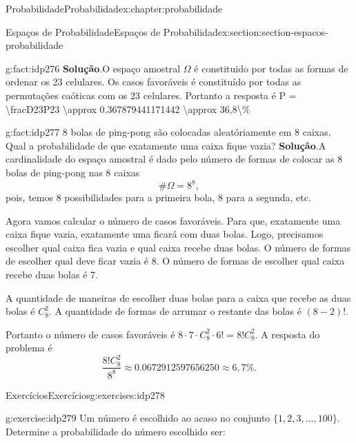 \documentclass[oneside,10pt,]{book}
\newcommand{\blocktitlefont}{\relax}
\numberwithin{equation}{section}
\begin{document}
\begin{chapterptx}{Probabilidade}{}{Probabilidade}{}{}{x:chapter:probabilidade}
\begin{sectionptx}{Espaços de Probabilidade}{}{Espaços de Probabilidade}{}{}{x:section:section-espacos-probabilidade}
\begin{fact}{}{}{g:fact:idp276}
\textbf{\blocktitlefont Solução}.\quad{}O espaço amostral \(\Omega\) é constituido por todas as formas de ordenar os 23 celulares. Os casos favoráveis é constituído por todas as permutações caóticas com os 23 celulares. Portanto a resposta é \textdollar{}\textdollar{}P = \textbackslash{}frac\textbraceleft{}D\textunderscore{}\textbraceleft{}23\textbraceright{}\textbraceright{}\textbraceleft{}P\textunderscore{}\textbraceleft{}23\textbraceright{}\textbraceright{} \textbackslash{}approx 0.367879441171442 \textbackslash{}approx 36,8\textbackslash{}\%\textdollar{}\textdollar{}%
\end{fact}
\begin{fact}{}{}{g:fact:idp277}%
8 bolas de ping-pong são colocadas aleatóriamente em 8 caixas. Qual a probabilidade de que exatamente uma caixa fique vazia?%
\textbf{\blocktitlefont Solução}.\quad{}A cardinalidade do espaço amostral é dado pelo número de formas de colocar as 8 bolas de ping-pong nas 8 caixas%
\begin{equation*}
\#\Omega = 8^8, 
\end{equation*}
pois, temos 8 possibilidades para a primeira bola, 8 para a segunda, etc.%
\par
Agora vamos calcular o número de casos favoráveis. Para que, exatamente uma caixa fique vazia, exatamente uma ficará com duas bolas. Logo, precisamos escolher qual caixa fica vazia e qual caixa recebe duas bolas. O número de formas de escolher qual deve ficar vazia é 8. O número de formas de escolher qual caixa recebe duas bolas é 7.%
\par
A quantidade de maneiras de escolher duas bolas para a caixa que recebe as duas bolas é \(C_8^2\). A quantidade de formas de arrumar o restante das bolas é \((8-2)!\).%
\par
Portanto o número de casos favoráveis é \(8\cdot 7 \cdot C_8^2\cdot 6! = 8!C_8^2\). A resposta do problema é%
\begin{equation*}
\frac{8!C_8^2}{8^8} \approx 0.0672912597656250 \approx 6,7\%. 
\end{equation*}
%
\end{fact}
%
%
\typeout{************************************************}
\typeout{************************************************}
%
\begin{exercises-subsection}{Exercícios}{}{Exercícios}{}{}{g:exercises:idp278}
\begin{divisionexercise}{1}{}{}{g:exercise:idp279}%
Um número é escolhido ao acaso no conjunto \(\{1, 2, 3, ..., 100\}\). Determine a probabilidade do número escolhido ser:%

\end{divisionexercise}
\end{exercises-subsection}
\end{sectionptx}
\end{chapterptx}
\end{document}
